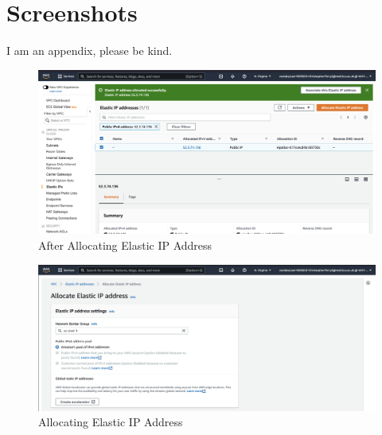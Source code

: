 \titleformat{\chapter}{\normalfont\huge\bfseries}{\IfAppendix{\appendixname\,\thechapter:\hspace{-14pt} }{\thechapter}}{14pt}{}
\chapter{Screenshots}

I am an appendix, please be kind.

\begin{figure}[H]
    \centering
        \includegraphics[width=\textwidth]{resources/after-allocate-elastic-ip-address.png}
    \caption{After Allocating Elastic IP Address}
    \label{fig:after-allocate-elastic-ip-address}
\end{figure}


\begin{figure}[H]
    \centering
        \includegraphics[width=\textwidth]{resources/allocate-elastic-ip-address.png}
    \caption{Allocating Elastic IP Address}
    \label{fig:allocate-elastic-ip-address}
\end{figure}



